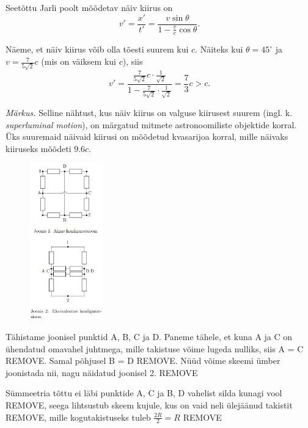 \documentclass[10pt]{article}
\newcommand{\pp}[1]{REMOVE}
\begin{document}
Seetõttu Jarli poolt mõõdetav näiv kiirus on
\begin{equation*}
v' = \frac{x'}{t'} = \frac{v \sin \theta}{1- \frac{v}{c}\cos\theta}.
\end{equation*}

Näeme, et näiv kiirus võib olla tõesti suurem kui $c$. Näiteks kui $\theta = 45^\circ$ ja $v = \frac{7}{5\sqrt 2}c$ (mis on väiksem kui $c$), siis
\begin{equation*}
v' = \frac{\frac{7}{5\sqrt 2} c \cdot \frac{1}{\sqrt 2}}{1- \frac{7}{5\sqrt 2} \cdot \frac{1}{\sqrt 2}} = \frac{7}{3} c > c.
\end{equation*}

\textit{Märkus.} Selline nähtust, kus näiv kiirus on valguse kiirusest suurem (ingl. k. \textit{superluminal motion}), on märgatud mitmete astronoomiliste objektide korral. Üks suuremaid näivaid kiirusi on mõõdetud kvasarijoa korral, mille näivaks kiiruseks mõõdeti $\num{9.6}c$.
\probend
\bigskip

\setAuthor{}

\solu
\begin{figure}
    \vspace{-30pt}
	\includegraphics[width=0.28\textwidth]{2020-v2g-04-yl.jpg}
	\vspace{-40pt}
\end{figure}
Tähistame joonisel punktid A, B, C
ja D. Paneme tähele, et kuna
A ja C on ühendatud omavahel
juhtmega, mille takistuse võime
lugeda nulliks, siis A = C \pp{1}. Samal
põhjusel B = D \pp{1}. Nüüd võime
skeemi ümber joonistada nii, nagu
näidatud joonisel 2. \pp{2}

Sümmeetria tõttu ei läbi punktide A, C ja B, D vahelist silda kunagi vool \pp{2}, seega lihtsustub skeem
kujule, kus on vaid neli ülejäänud takistit \pp{1}, mille kogutakistuseks tuleb $\frac{2R}{2} = R$ \pp{1}
\probend
\bigskip
\end{document}
